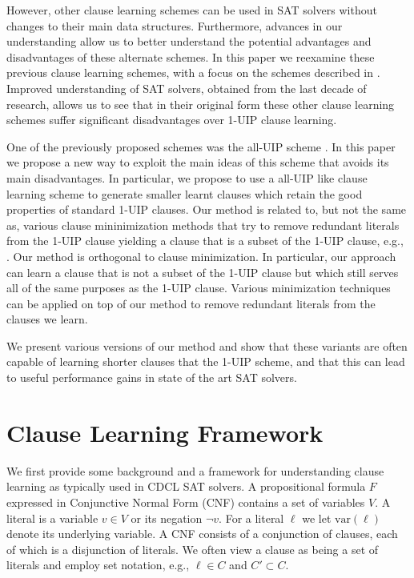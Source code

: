 \documentclass[runningheads]{llncs}
\newcommand{\sat}{SAT\xspace}
\newcommand{\var}{\text{var}}
\begin{document}
However, other clause learning schemes can be used in SAT solvers
without changes to their main data structures. Furthermore, advances
in our understanding allow us to better understand the potential
advantages and disadvantages of these alternate schemes. In this paper
we reexamine these previous clause learning schemes, with a
focus on the schemes described in
\cite{DBLP:conf/iccad/ZhangMMM01}. Improved understanding of \sat
solvers, obtained from the last decade of research, allows us to see
that in their original form these other clause learning schemes suffer
significant disadvantages over 1-UIP clause learning.

One of the previously proposed schemes was the all-UIP scheme
\cite{DBLP:conf/iccad/ZhangMMM01}. In this paper we propose a new way
to exploit the main ideas of this scheme that avoids its main
disadvantages. In particular, we propose to use a all-UIP like clause
learning scheme to generate smaller learnt clauses which retain the
good properties of standard 1-UIP clauses. Our method is related to,
but not the same as, various clause mininimization methods that try to
remove redundant literals from the 1-UIP clause yielding a clause that
is a subset of the 1-UIP clause, e.g.,
\cite{DBLP:conf/sat/SorenssonB09,DBLP:conf/ijcai/LuoLXML17,DBLP:conf/sat/WieringaH13}.
Our method is orthogonal to clause minimization. In particular, our
approach can learn a clause that is not a subset of the 1-UIP clause but
which still serves all of the same purposes as the 1-UIP clause.
Various minimization techniques can be applied on top of our method to
remove redundant literals from the clauses we learn.

We present various versions of our method and show that these variants
are often capable of learning shorter clauses that the 1-UIP scheme,
and that this can lead to useful performance gains in state of the art
\sat solvers.

\section{Clause Learning Framework}
We first provide some background and a framework for understanding
clause learning as typically used in CDCL \sat solvers. A
propositional formula $F$ expressed in Conjunctive Normal Form (CNF)
contains a set of variables $V$. A literal is a variable $v\in V$ or
its negation $\lnot v$. For a literal $\ell$ we let $\var(\ell)$
denote its underlying variable. A CNF consists of a conjunction of
clauses, each of which is a disjunction of literals. We often view a
clause as being a set of literals and employ set notation, e.g.,
$\ell\in C$ and $C'\subset C$. 
\end{document}
